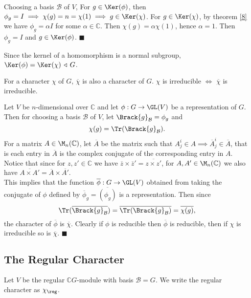 \documentclass[../Project.tex]{subfiles}
\begin{document}
\begin{proo*}[\cite{2}]
	Choosing a basis $\mathcal{B}$ of $V$,
	For $g \in \Ker(\phi)$, then $\phi_g = I \implies \chi(g) = n = \chi(1) \implies g \in \Ker(\chi)$. For $g \in \Ker(\chi)$, by theorem \ref{8} we have $\phi_g = \alpha I$ for some $\alpha \in \mathbb{C}$. Then $\chi(g) = \alpha \chi(1)$, hence $\alpha = 1$. Then $\phi_g = I$ and $g \in \Ker(\phi)$. $\blacksquare$
\end{proo*}

\begin{coro}
	Since the kernel of a homomorphism is a normal subgroup, $\Ker(\phi) = \Ker(\chi)\,\triangleleft\,G$.
\end{coro}

\begin{prop}[\cite{2}]
	For a character $\chi$ of $G$, $\overline{\chi}$ is also a character of $G$. $\chi$ is irreducible $\iff$ $\overline{\chi}$ is irreducible.
\end{prop}

\begin{proo*}
	Let $V$ be $n$-dimensional over $\mathbb{C}$ and let $\phi : G \to \GL(V)$ be a representation of $G$. Then for choosing a basis $\mathcal{B}$ of $V$, let $\Brack{g}_\mathcal{B} = \phi_g$ and
	$$\chi(g) = \Tr(\Brack{g}_\mathcal{B}).$$
	For a matrix $A \in \M_n(\mathbb{C})$, let $\overline{A}$ be the matrix such that $A^i_j \in A \implies \overline{A}^i_j \in \overline{A}$, that is each entry in $\overline{A}$ is the complex conjugate of the corresponding entry in $A$. Notice that since for $z,z' \in \mathbb{C}$ we have $\overline{z} \times \overline{z}' = \overline{z \times z'}$, for $A,A' \in \M_n(\mathbb{C})$ we also have $\overline{A\times A'} = \overline{A}\times\overline{A'}$.\\

	This implies that the function $\overline{\phi} : G \to \GL(V)$ obtained from taking the conjugate of $\phi$ defined by $\overline{\phi}_g = \overline{(\phi_g)}$ is a representation. Then since 
	$$\Tr({\overline{\Brack{g}_\mathcal{B}}}) = \overline{\Tr(\Brack{g}_\mathcal{B})} = \overline{\chi(g)},$$
	the character of $\overline{\phi}$ is $\overline{\chi}$. Clearly if $\phi$ is reducible then $\overline{\phi}$ is reducible, then if $\chi$ is irreducible so is $\overline{\chi}$. $\blacksquare$
\end{proo*}

\newpage
\subsection{The Regular Character}
\begin{defi}
	Let $V$ be the regular $\mathbb{C}G$-module with basis $\mathcal{B} = G$. We write the regular character as $\chi_{\reg}$.
\end{defi}
\end{document}
